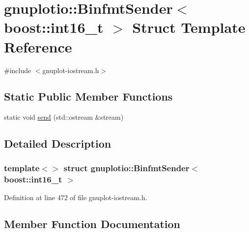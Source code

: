 \hypertarget{structgnuplotio_1_1_binfmt_sender_3_01boost_1_1int16__t_01_4}{}\section{gnuplotio\+:\+:Binfmt\+Sender$<$ boost\+:\+:int16\+\_\+t $>$ Struct Template Reference}
\label{structgnuplotio_1_1_binfmt_sender_3_01boost_1_1int16__t_01_4}


{\ttfamily \#include $<$gnuplot-\/iostream.\+h$>$}

\subsection*{Static Public Member Functions}
\begin{DoxyCompactItemize}
\item 
static void \hyperlink{structgnuplotio_1_1_binfmt_sender_3_01boost_1_1int16__t_01_4_a6d3c1b829c9196fa9d1f53bd78a90e34}{send} (std\+::ostream \&stream)
\end{DoxyCompactItemize}


\subsection{Detailed Description}
\subsubsection*{template$<$$>$\newline
struct gnuplotio\+::\+Binfmt\+Sender$<$ boost\+::int16\+\_\+t $>$}



Definition at line 472 of file gnuplot-\/iostream.\+h.



\subsection{Member Function Documentation}
\mbox{\label{structgnuplotio_1_1_binfmt_sender_3_01boost_1_1int16__t_01_4_a6d3c1b829c9196fa9d1f53bd78a90e34}} 
